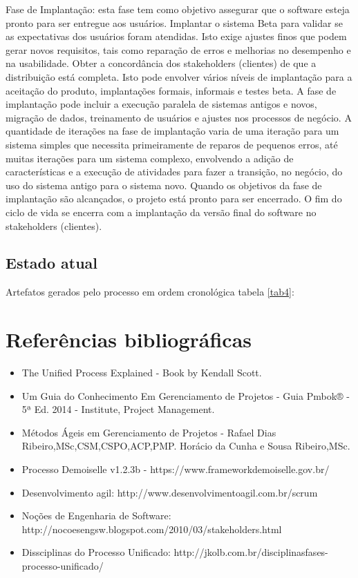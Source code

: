 \documentclass[	DIV=calc,%
							paper=a4,%
							fontsize=12pt,%
							onecolumn]{scrartcl}	 					%
\begin{document}
Fase de Implantação: esta fase tem como objetivo assegurar que o software esteja pronto para ser entregue aos usuários.
Implantar o sistema Beta para validar se as expectativas dos usuários foram atendidas. Isto exige ajustes finos que podem gerar novos requisitos, tais como reparação de erros e melhorias no desempenho e na usabilidade. Obter a concordância dos stakeholders (clientes) de que a distribuição está completa. Isto pode envolver vários níveis de implantação para a aceitação do produto, implantações formais, informais e testes beta. 
A fase de implantação pode incluir a execução paralela de sistemas antigos e novos, migração de dados, treinamento de usuários e ajustes nos processos de negócio. A quantidade de iterações na fase de implantação varia de uma iteração para um sistema simples que necessita primeiramente de reparos de pequenos erros, até muitas iterações para um sistema complexo, envolvendo a adição de características e a execução de atividades para fazer a transição, no negócio, do uso do sistema antigo para o sistema novo. Quando os objetivos da fase de implantação são alcançados, o projeto está pronto para ser encerrado. O fim do ciclo de vida se encerra com a implantação da versão final do software no stakeholders (clientes).

    
\subsection {Estado atual}

Artefatos gerados pelo processo em ordem cronológica tabela \ref{tab4}:



\section{Referências bibliográficas}
\renewcommand\refname{} %

\begin{itemize}

\item The Unified Process Explained - Book by Kendall Scott.
\item Um Guia do Conhecimento Em Gerenciamento de Projetos - Guia Pmbok® - 5ª Ed. 2014 - Institute, Project Management.
\item Métodos Ágeis em Gerenciamento de Projetos - Rafael Dias Ribeiro,MSc,CSM,CSPO,ACP,PMP. Horácio da Cunha e Sousa Ribeiro,MSc.
\item Processo Demoiselle v1.2.3b -	https://www.frameworkdemoiselle.gov.br/

\item Desenvolvimento agil: http://www.desenvolvimentoagil.com.br/scrum

\item Noções de Engenharia de Software: http://nocoesengsw.blogspot.com/2010/03/stakeholders.html

\item Dissciplinas do Processo Unificado: http://jkolb.com.br/disciplinasfases-processo-unificado/

\end{itemize}
  
\end{document}
